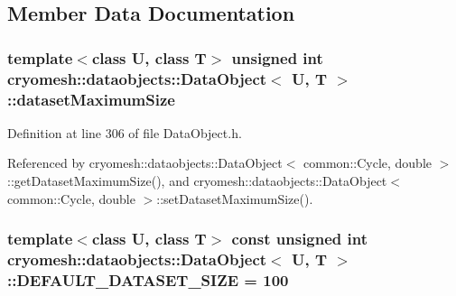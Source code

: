 \subsection{\-Member \-Data \-Documentation}
\hypertarget{classcryomesh_1_1dataobjects_1_1DataObject_acec41108abc1ba2b1228e79bf14bb991}{
\subsubsection[{dataset\-Maximum\-Size}]{\setlength{\rightskip}{0pt plus 5cm}template$<$class \-U, class \-T$>$ unsigned int {\bf cryomesh\-::dataobjects\-::\-Data\-Object}$<$ \-U, \-T $>$\-::{\bf dataset\-Maximum\-Size}}}\label{classcryomesh_1_1dataobjects_1_1DataObject_acec41108abc1ba2b1228e79bf14bb991}


\-Definition at line 306 of file \-Data\-Object.\-h.



\-Referenced by cryomesh\-::dataobjects\-::\-Data\-Object$<$ common\-::\-Cycle, double $>$\-::get\-Dataset\-Maximum\-Size(), and cryomesh\-::dataobjects\-::\-Data\-Object$<$ common\-::\-Cycle, double $>$\-::set\-Dataset\-Maximum\-Size().

\hypertarget{classcryomesh_1_1dataobjects_1_1DataObject_a493f002671f8c2d4db2b2a2953e434a0}{
\subsubsection[{\-D\-E\-F\-A\-U\-L\-T\-\_\-\-D\-A\-T\-A\-S\-E\-T\-\_\-\-S\-I\-Z\-E}]{\setlength{\rightskip}{0pt plus 5cm}template$<$class \-U, class \-T$>$ const unsigned int {\bf cryomesh\-::dataobjects\-::\-Data\-Object}$<$ \-U, \-T $>$\-::{\bf \-D\-E\-F\-A\-U\-L\-T\-\_\-\-D\-A\-T\-A\-S\-E\-T\-\_\-\-S\-I\-Z\-E} = 100}}\label{classcryomesh_1_1dataobjects_1_1DataObject_a493f002671f8c2d4db2b2a2953e434a0}



